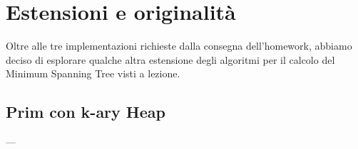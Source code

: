\section{Estensioni e originalità}
\label{cap:extensions-and-originalities}

Oltre alle tre implementazioni richieste dalla consegna dell'homework, abbiamo deciso di esplorare qualche altra estensione degli algoritmi per il calcolo del Minimum Spanning Tree visti a lezione.

\subsection{Prim con k-ary Heap}
---